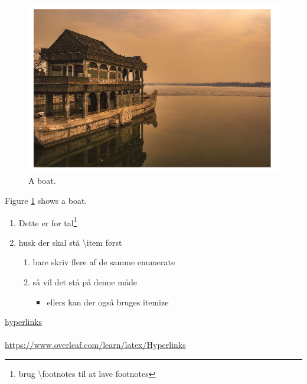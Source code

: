 \documentclass[12pt]{report}
\begin{document}
\newpage

\begin{figure}
  \includegraphics[width=\linewidth]{boat.png} 
  \caption{A boat.}
  \label{fig:boat1}
\end{figure}

Figure \ref{fig:boat1} shows a boat.

\newpage

\begin{enumerate}
\item Dette er for tal\footnote{brug \textbackslash footnotes til at lave footnotes}
\item husk der skal stå \textbackslash item først
\begin{enumerate}
\item bare skriv flere af de samme enumerate 
\item så vil det stå på denne måde 
\begin{itemize}
\item ellers kan der også bruges itemize
\end{itemize}
\end{enumerate}
\end{enumerate}
 \newpage 
 \href{https://www.overleaf.com/learn/latex/Hyperlinks} {hyperlinks} \\ \\
 \url{https://www.overleaf.com/learn/latex/Hyperlinks}
\end{document}
